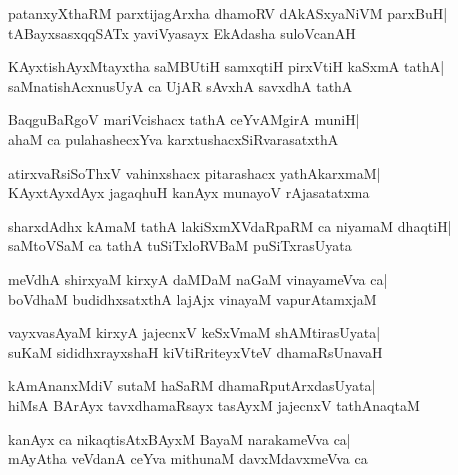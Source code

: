 \documentclass[twoside,12pt,openright]{book}
\newcounter{shloka}[chapter]
\begin{document}
\begin{shloka}%
patanxyXthaRM parxtijagArxha dhamoRV dAkASxyaNiVM parxBuH|\\
tABayxsasxqqSATx yaviVyasayx EkAdasha suloVcanAH
\end{shloka}

\begin{shloka}%
KAyxtishAyxMtayxtha saMBUtiH samxqtiH pirxVtiH kaSxmA tathA|\\
saMnatishAcxnusUyA ca UjAR sAvxhA savxdhA tathA
\end{shloka}

\begin{shloka}%
BaqguBaRgoV mariVcishacx tathA ceYvAMgirA muniH|\\
ahaM ca pulahashecxYva karxtushacxSiRvarasatxthA
\end{shloka}

\begin{shloka}%
atirxvaRsiSoThxV vahinxshacx pitarashacx yathAkarxmaM|\\
KAyxtAyxdAyx jagaqhuH kanAyx munayoV rAjasatatxma
\end{shloka}

\begin{shloka}%
sharxdAdhx kAmaM tathA lakiSxmXVdaRpaRM ca niyamaM dhaqtiH|\\
saMtoVSaM ca tathA tuSiTxloRVBaM puSiTxrasUyata
\end{shloka}

\begin{shloka}%
meVdhA shirxyaM kirxyA daMDaM naGaM vinayameVva ca|\\
boVdhaM budidhxsatxthA lajAjx vinayaM vapurAtamxjaM
\end{shloka}

\begin{shloka}%
vayxvasAyaM kirxyA jajecnxV keSxVmaM shAMtirasUyata|\\
suKaM sididhxrayxshaH kiVtiRriteyxVteV dhamaRsUnavaH
\end{shloka}

\begin{shloka}%
kAmAnanxMdiV sutaM haSaRM dhamaRputArxdasUyata|\\
hiMsA BArAyx tavxdhamaRsayx tasAyxM jajecnxV tathAnaqtaM
\end{shloka}

\begin{shloka}%
kanAyx ca nikaqtisAtxBAyxM BayaM narakameVva ca|\\
mAyAtha veVdanA ceYva mithunaM davxMdavxmeVva ca
\end{shloka}
\end{document}
